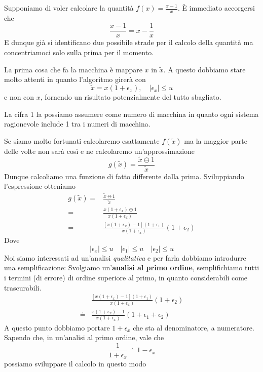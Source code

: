 \begin{example}
	Supponiamo di voler calcolare la quantità $f(x) = \frac{x - 1}{x}$. \`E immediato accorgersi che
	\[ \frac{x - 1}{x} = x - \frac{1}{x} \]
	E dunque già si identificano due possibile strade per il calcolo della quantità ma concentriamoci solo
	sulla prima per il momento.

	La prima cosa che fa la macchina è mappare $x$ in $\tilde{x}$. A questo dobbiamo stare molto attenti in
	quanto l'algoritmo girerà con
	\[ \tilde{x} = x (1 + \epsilon_x), \quad |\epsilon_x| \leq u \]
	e non con $x$, fornendo un risultato potenzialmente del tutto sbagliato.

	La cifra 1 la possiamo assumere come numero di macchina in quanto ogni sistema ragionevole include 1 tra
	i numeri di macchina.

	Se siamo molto fortunati calcolaremo esattamente $f(\tilde{x})$ ma la maggior parte delle volte non sarà
	così e ne calcolaremo un'approssimazione
	\[ g(\tilde{x}) = \frac{\tilde{x} \ominus 1}{\tilde{x}} \]
	Dunque calcoliamo una funzione di fatto differente dalla prima. Sviluppiando l'espressione otteniamo
	\begin{align*}
		g(\tilde{x})  = & \frac{\tilde{x} \ominus 1}{\tilde{x}}                                                \\
		=               & \frac{x (1 + \epsilon_x) \ominus 1}{x (1 + \epsilon_x)}                              \\
		=               & \frac{[x (1 + \epsilon_x) - 1](1 + \epsilon_1)}{x (1 + \epsilon_x)} (1 + \epsilon_2)
	\end{align*}
	Dove
	\[ |\epsilon_x| \leq u \quad |\epsilon_1| \leq u \quad |\epsilon_2| \leq u \]
	Noi siamo interessati ad un'analisi \emph{qualitativa} e per farla dobbiamo introdurre una semplificazione:
	Svolgiamo un'\textbf{analisi al primo ordine}, semplifichiamo tutti i termini (di errore) di ordine superiore
	al primo, in quanto considerabili come trascurabili.
	\begin{align*}
		       & \frac{[x (1 + \epsilon_x) - 1](1 + \epsilon_1)}{x (1 + \epsilon_x)} (1 + \epsilon_2) \\
		\doteq & \frac{x (1 + \epsilon_x) - 1}{x (1 + \epsilon_x)} (1 + \epsilon_1 + \epsilon_2)
	\end{align*}
	A questo punto dobbiamo portare $1 + \epsilon_x$ che sta al denominatore, a numeratore. Sapendo che, in
	un'analisi al primo ordine, vale che
	\[ \frac{1}{1 + \epsilon_x} \doteq 1 - \epsilon_x \]
	possiamo sviluppare il calcolo in questo modo

\end{example}
